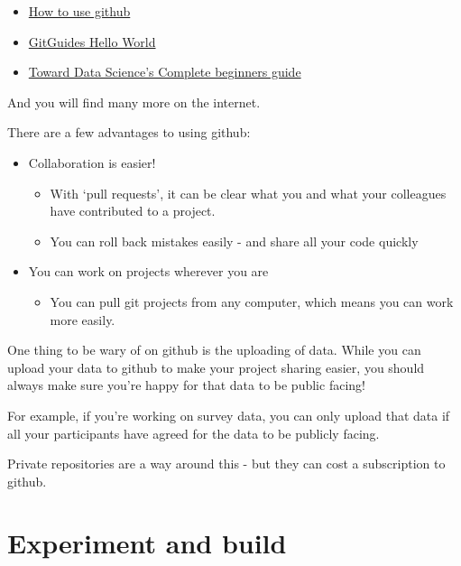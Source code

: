 \documentclass[
]{book}
\providecommand{\tightlist}{%
  \setlength{\itemsep}{0pt}\setlength{\parskip}{0pt}}
\begin{document}
\begin{itemize}
\item
  \href{https://product.hubspot.com/blog/git-and-github-tutorial-for-beginners}{How to use github}
\item
  \href{https://guides.github.com/activities/hello-world/}{GitGuides Hello World}
\item
  \href{https://towardsdatascience.com/getting-started-with-git-and-github-6fcd0f2d4ac6}{Toward Data Science's Complete beginners guide}
\end{itemize}

And you will find many more on the internet.

There are a few advantages to using github:

\begin{itemize}
\tightlist
\item
  Collaboration is easier!

  \begin{itemize}
  \tightlist
  \item
    With `pull requests', it can be clear what you and what your colleagues have contributed to a project.
  \item
    You can roll back mistakes easily - and share all your code quickly
  \end{itemize}
\item
  You can work on projects wherever you are

  \begin{itemize}
  \tightlist
  \item
    You can pull git projects from any computer, which means you can work more easily.
  \end{itemize}
\end{itemize}

\begin{hey}
One thing to be wary of on github is the uploading of data. While you
can upload your data to github to make your project sharing easier, you
should always make sure you're happy for that data to be public facing!

For example, if you're working on survey data, you can only upload that
data if all your participants have agreed for the data to be publicly
facing.

Private repositories are a way around this - but they can cost a
subscription to github.
\end{hey}

\hypertarget{experiment-and-build}{%
\section{Experiment and build}\label{experiment-and-build}}
\end{document}

